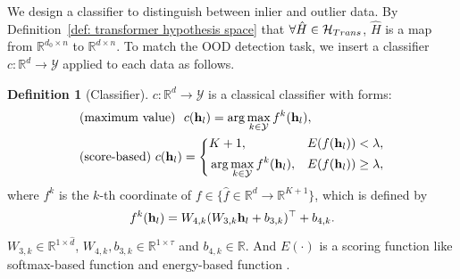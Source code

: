 \documentclass{article}
\theoremstyle{plain}
\theoremstyle{definition}
\newtheorem{definition}[theorem]{Definition}
\theoremstyle{remark}
\begin{document}
We design a classifier to distinguish between inlier and outlier data.
By Definition~\ref{def: transformer hypothesis space} that $\forall \hat{H} \in \mathcal{H}_{\rm Trans}$, $\hat{H}$ is a map from $\mathbb{R}^{d_0\times n}$ to $\mathbb{R}^{d\times n}$. 
To match the OOD detection task, we insert a classifier $c:\mathbb{R}^{d}\xrightarrow{} \mathcal{Y}$ applied to each data as follows.
\begin{definition}[Classifier]\label{def:classifier} $c:\mathbb{R}^{d}\xrightarrow{} \mathcal{Y}$ is a classical classifier with forms:
    \begin{equation}
    \small
    \begin{aligned}
        &\text{(maximum~value)}~~ c(\mathbf{h}_l) = \arg\max_{k\in \mathcal{Y} }f^{k}(\mathbf{h}_l),\\   
        &\text{(score-based)}~ c(\mathbf{h}_l) = 
        \left\{
            \begin{aligned}
            &K+1, &E(f(\mathbf{h}_l))<\lambda, \\
            &\arg\max_{k\in \mathcal{Y} }f^{k}(\mathbf{h}_l), &E(f(\mathbf{h}_l))\geq \lambda,
            \end{aligned}
            \right.
    \end{aligned}
    \end{equation}
    where $f^k$ is the $k$-th coordinate of $f\in \{\hat{f} \in \mathbb{R}^{d}\xrightarrow{}\mathbb{R}^{K+1}\}$, which is defined by 
    \begin{equation}
    \small
        f^k(\mathbf{h}_l) = W_{4,k}(W_{3,k}\mathbf{h}_l + b_{3,k})^{\top}+b_{4,k}.
    \end{equation}
    $W_{3,k} \in \mathbb{R}^{1\times \hat{d}}$, $W_{4,k},b_{3,k}\in \mathbb{R}^{1\times \tau}$ and  $b_{4,k}\in \mathbb{R}$.
    And $E(\cdot)$ is a scoring function like softmax-based function \citep{hendrycks2016baseline} and energy-based function \citep{liu2020energy}.
\end{definition}
\end{document}
